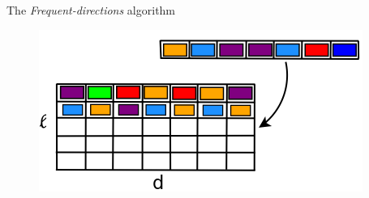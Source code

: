 \documentclass[first=dgreen,second=purple,logo=redque]{aaltoslides}
\begin{document}
\begin{frame}[allowframebreaks=1]{The \textit{Frequent-directions} algorithm}
\framebreak

\begin{figure}
  \includegraphics[scale=0.4]{plots/fd6}
 \label{fig:fd6}
\end{figure} 

\end{frame}


%

%
%

\end{document}
